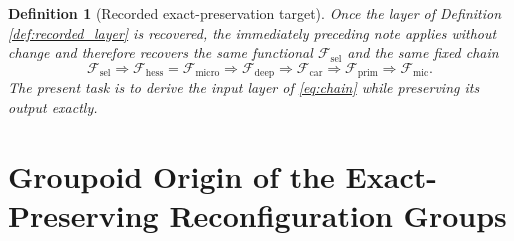 \documentclass[11pt]{article}
\newcommand{\MicFunctional}{\mathscr F_{\mathrm{mic}}}
\newcommand{\PrimFunctional}{\mathscr F_{\mathrm{prim}}}
\newcommand{\CarrierFunctional}{\mathscr F_{\mathrm{car}}}
\newcommand{\DeepFunctional}{\mathscr F_{\mathrm{deep}}}
\newcommand{\UltraFunctional}{\mathscr F_{\mathrm{micro}}}
\newcommand{\RootFunctional}{\mathscr F_{\mathrm{hess}}}
\newcommand{\StemFunctional}{\mathscr F_{\mathrm{sel}}}
\newtheorem{definition}{Definition}
\begin{document}
\begin{definition}[Recorded exact-preservation target]
\label{def:recorded_target}
Once the layer of Definition \ref{def:recorded_layer} is recovered, the immediately preceding note applies without change and therefore recovers the same functional \(\StemFunctional\) and the same fixed chain
\begin{equation}
\StemFunctional
\Longrightarrow
\RootFunctional=\UltraFunctional
\Longrightarrow
\DeepFunctional
\Longrightarrow
\CarrierFunctional
\Longrightarrow
\PrimFunctional
\Longrightarrow
\MicFunctional.
\label{eq:chain}
\end{equation}
The present task is to derive the input layer of \eqref{eq:chain} while preserving its output exactly.
\end{definition}

\section{Groupoid Origin of the Exact-Preserving Reconfiguration Groups}
\end{document}
